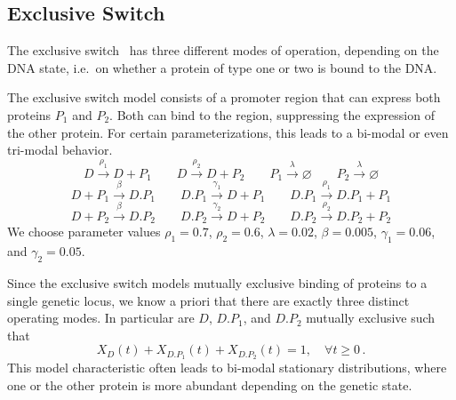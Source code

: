 \subsection{Exclusive Switch}
The exclusive switch~\cite{barzel2008calculation}  has three different modes of operation, depending on the
DNA state, i.e.\ on whether a protein of type one or two is bound to
the DNA.

\begin{model}\label{model:excl_switch}
The exclusive switch model consists of a promoter region
that can express both proteins $P_1$ and $P_2$. Both can bind to the region, suppressing
the expression of the other protein. For certain parameterizations, this leads to a
bi-modal or even tri-modal behavior.
$$ D \xrightarrow{\rho_1} D + P_1 \qquad D \xrightarrow{\rho_2} D + P_2 \qquad P_1 \xrightarrow{\lambda}\varnothing \qquad P_2 \xrightarrow{\lambda} \varnothing $$
$$ D + P_1 \xrightarrow{\beta} D.P_1 \qquad D.P_1 \xrightarrow{\gamma_1} D + P_1 \qquad D.P_1 \xrightarrow{\rho_1} D.P_1 + P_1 $$
$$ D + P_2 \xrightarrow{\beta} D.P_2 \qquad D.P_2 \xrightarrow{\gamma_2} D + P_2 \qquad D.P_2 \xrightarrow{\rho_2} D.P_2 + P_2 $$
We choose parameter values $\rho_1 = 0.7$, $\rho_2 = 0.6$, $\lambda=0.02$, $\beta=0.005$, $\gamma_1 = 0.06$, and $\gamma_2 = 0.05$.
\end{model}
Since the exclusive switch models mutually exclusive binding of proteins to a single genetic locus,
we know a priori that there are exactly three distinct operating modes.
In particular are $D$, $D.P_1$, and $D.P_2$ mutually exclusive such that \[X_{D}(t) + X_{D.P_1}(t) + X_{D.P_2}(t) = 1, \quad \forall t\geq 0\,.\]
This model characteristic often leads to bi-modal stationary distributions, where one or the other protein is more abundant depending on the genetic state.

